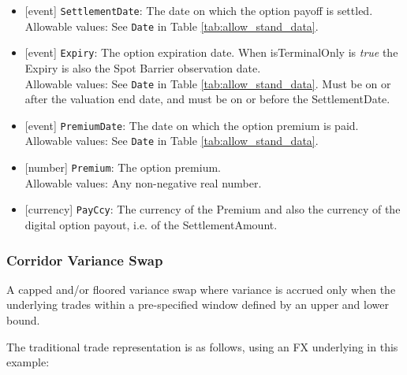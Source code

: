 \begin{itemize}
  \item{}[event] \lstinline!SettlementDate!: The date on which the option payoff is settled. \\
  Allowable values: See \lstinline!Date! in Table \ref{tab:allow_stand_data}.
  \item{}[event] \lstinline!Expiry!: The option expiration date. When isTerminalOnly is \emph{true} the Expiry is also the Spot Barrier observation date.\\
  Allowable values: See \lstinline!Date! in Table \ref{tab:allow_stand_data}. Must be on or after the valuation end date, and must be on or before the SettlementDate.
  \item{}[event] \lstinline!PremiumDate!: The date on which the option premium is paid. \\
  Allowable values: See \lstinline!Date! in Table \ref{tab:allow_stand_data}.
  \item{}[number] \lstinline!Premium!: The option premium. \\
  Allowable values: Any non-negative real number.
  \item{}[currency] \lstinline!PayCcy!: The currency of the Premium and also the currency of the digital option payout, i.e.  of the SettlementAmount.
\end{itemize}

\subsubsection{Corridor Variance Swap}

A capped and/or floored variance swap where variance is accrued only when the underlying trades within a pre-specified window defined by an upper and lower bound.

The traditional trade representation is as follows, using an FX underlying in this example:

